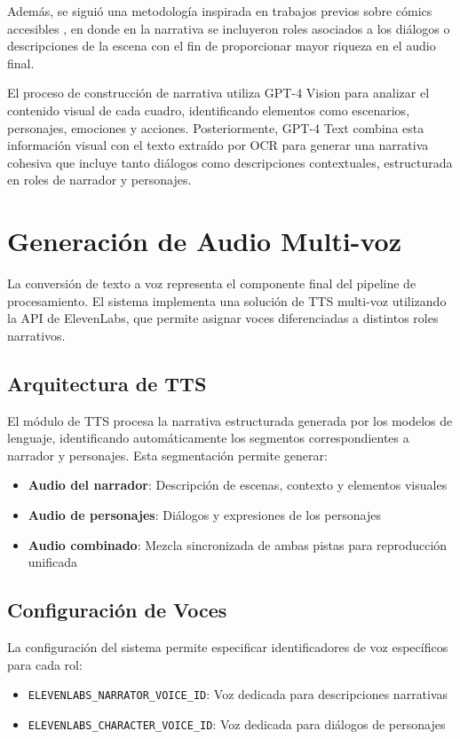 \documentclass[conference]{IEEEtran}
\begin{document}
Además, se siguió una metodología inspirada en trabajos previos sobre cómics accesibles \cite{sharma2021accesscomics}, en donde en la narrativa se incluyeron roles asociados a los diálogos o descripciones de la escena con el fin de proporcionar mayor riqueza en el audio final.

El proceso de construcción de narrativa utiliza GPT-4 Vision para analizar el contenido visual de cada cuadro, identificando elementos como escenarios, personajes, emociones y acciones. Posteriormente, GPT-4 Text combina esta información visual con el texto extraído por OCR para generar una narrativa cohesiva que incluye tanto diálogos como descripciones contextuales, estructurada en roles de narrador y personajes.

\section{Generación de Audio Multi-voz}
La conversión de texto a voz representa el componente final del pipeline de procesamiento. El sistema implementa una solución de TTS multi-voz utilizando la API de ElevenLabs, que permite asignar voces diferenciadas a distintos roles narrativos.

\subsection{Arquitectura de TTS}
El módulo de TTS procesa la narrativa estructurada generada por los modelos de lenguaje, identificando automáticamente los segmentos correspondientes a narrador y personajes. Esta segmentación permite generar:
\begin{itemize}
\item \textbf{Audio del narrador}: Descripción de escenas, contexto y elementos visuales
\item \textbf{Audio de personajes}: Diálogos y expresiones de los personajes
\item \textbf{Audio combinado}: Mezcla sincronizada de ambas pistas para reproducción unificada
\end{itemize}

\subsection{Configuración de Voces}
La configuración del sistema permite especificar identificadores de voz específicos para cada rol:
\begin{itemize}
\item \texttt{ELEVENLABS\_NARRATOR\_VOICE\_ID}: Voz dedicada para descripciones narrativas
\item \texttt{ELEVENLABS\_CHARACTER\_VOICE\_ID}: Voz dedicada para diálogos de personajes
\end{itemize}
\end{document}
